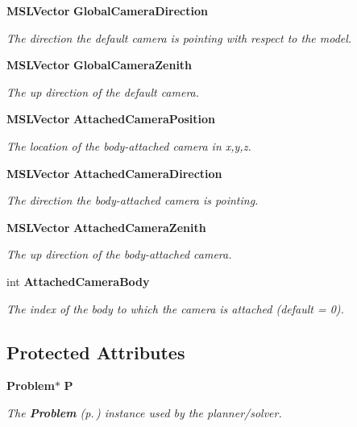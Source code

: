 \begin{CompactItemize}
{\bf MSLVector} {\bf Global\-Camera\-Direction}
\begin{CompactList}\small\item\em The direction the default camera is pointing with respect to the model.\item\end{CompactList}\item 
{\bf MSLVector} {\bf Global\-Camera\-Zenith}
\begin{CompactList}\small\item\em The up direction of the default camera.\item\end{CompactList}\item 
{\bf MSLVector} {\bf Attached\-Camera\-Position}
\begin{CompactList}\small\item\em The location of the body-attached camera in x,y,z.\item\end{CompactList}\item 
{\bf MSLVector} {\bf Attached\-Camera\-Direction}
\begin{CompactList}\small\item\em The direction the body-attached camera is pointing.\item\end{CompactList}\item 
{\bf MSLVector} {\bf Attached\-Camera\-Zenith}
\begin{CompactList}\small\item\em The up direction of the body-attached camera.\item\end{CompactList}\item 
int {\bf Attached\-Camera\-Body}
\begin{CompactList}\small\item\em The index of the body to which the camera is attached (default = 0).\item\end{CompactList}\end{CompactItemize}
\subsection*{Protected Attributes}
\begin{CompactItemize}
\item 
{\bf Problem}$\ast$ {\bf P}
\begin{CompactList}\small\item\em The {\bf Problem} {\rm (p.\,\pageref{classProblem})} instance used by the planner/solver.\item\end{CompactList}\end{CompactItemize}


